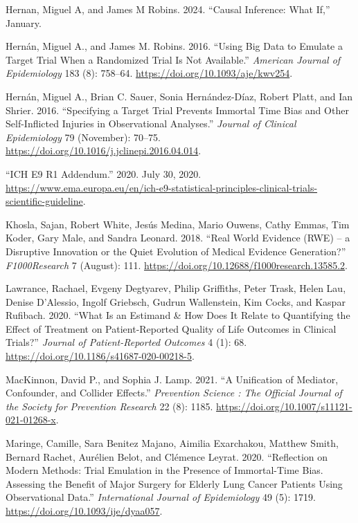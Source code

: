 \documentclass[
]{book}
\newlength{\cslhangindent}
\newenvironment{CSLReferences}[2] %
 {\begin{list}{}{%
  \setlength{\itemindent}{0pt}
  \setlength{\leftmargin}{0pt}
  \setlength{\parsep}{0pt}
  \ifodd #1
   \setlength{\leftmargin}{\cslhangindent}
   \setlength{\itemindent}{-1\cslhangindent}
  \fi
  \setlength{\itemsep}{#2\baselineskip}}}
 {\end{list}}
\begin{document}
\begin{CSLReferences}{1}{0}
Hernan, Miguel A, and James M Robins. 2024. {``Causal Inference: What
If,''} January.

Hernán, Miguel A., and James M. Robins. 2016. {``Using Big Data to
Emulate a Target Trial When a Randomized Trial Is Not Available.''}
\emph{American Journal of Epidemiology} 183 (8): 758--64.
\url{https://doi.org/10.1093/aje/kwv254}.

Hernán, Miguel A., Brian C. Sauer, Sonia Hernández-Díaz, Robert Platt,
and Ian Shrier. 2016. {``Specifying a Target Trial Prevents Immortal
Time Bias and Other Self-Inflicted Injuries in Observational
Analyses.''} \emph{Journal of Clinical Epidemiology} 79 (November):
70--75. \url{https://doi.org/10.1016/j.jclinepi.2016.04.014}.

{``ICH E9 R1 Addendum.''} 2020. July 30, 2020.
\url{https://www.ema.europa.eu/en/ich-e9-statistical-principles-clinical-trials-scientific-guideline}.

Khosla, Sajan, Robert White, Jesús Medina, Mario Ouwens, Cathy Emmas,
Tim Koder, Gary Male, and Sandra Leonard. 2018. {``Real World Evidence
({RWE}) -- a Disruptive Innovation or the Quiet Evolution of Medical
Evidence Generation?''} \emph{F1000Research} 7 (August): 111.
\url{https://doi.org/10.12688/f1000research.13585.2}.

Lawrance, Rachael, Evgeny Degtyarev, Philip Griffiths, Peter Trask,
Helen Lau, Denise D'Alessio, Ingolf Griebsch, Gudrun Wallenstein, Kim
Cocks, and Kaspar Rufibach. 2020. {``What Is an Estimand \& How Does It
Relate to Quantifying the Effect of Treatment on Patient-Reported
Quality of Life Outcomes in Clinical Trials?''} \emph{Journal of
Patient-Reported Outcomes} 4 (1): 68.
\url{https://doi.org/10.1186/s41687-020-00218-5}.

MacKinnon, David P., and Sophia J. Lamp. 2021. {``A Unification of
Mediator, Confounder, and Collider Effects.''} \emph{Prevention Science
: The Official Journal of the Society for Prevention Research} 22 (8):
1185. \url{https://doi.org/10.1007/s11121-021-01268-x}.

Maringe, Camille, Sara Benitez Majano, Aimilia Exarchakou, Matthew
Smith, Bernard Rachet, Aurélien Belot, and Clémence Leyrat. 2020.
{``Reflection on Modern Methods: Trial Emulation in the Presence of
Immortal-Time Bias. Assessing the Benefit of Major Surgery for Elderly
Lung Cancer Patients Using Observational Data.''} \emph{International
Journal of Epidemiology} 49 (5): 1719.
\url{https://doi.org/10.1093/ije/dyaa057}.


\end{CSLReferences}
\end{document}
